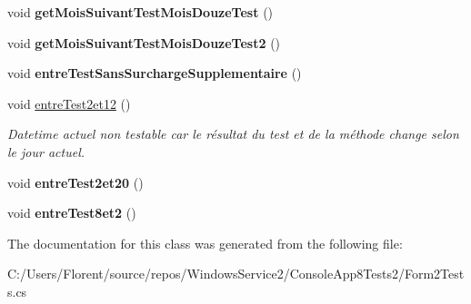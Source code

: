 \begin{DoxyCompactItemize}
void {\bfseries get\+Mois\+Suivant\+Test\+Mois\+Douze\+Test} ()
\item 
\mbox{\label{class_console_app8_1_1_tests_1_1_form2_tests_a39820ca5dbf72c7520d393cbc1061151}} 
void {\bfseries get\+Mois\+Suivant\+Test\+Mois\+Douze\+Test2} ()
\item 
\mbox{\label{class_console_app8_1_1_tests_1_1_form2_tests_af0edbaf4f9b3ba05e88de2fd713944c2}} 
void {\bfseries entre\+Test\+Sans\+Surcharge\+Supplementaire} ()
\item 
\mbox{\label{class_console_app8_1_1_tests_1_1_form2_tests_afc4010f74fbfdd5be9b918a9f07ba49f}} 
void \mbox{\hyperlink{class_console_app8_1_1_tests_1_1_form2_tests_afc4010f74fbfdd5be9b918a9f07ba49f}{entre\+Test2et12}} ()
\begin{DoxyCompactList}\small\item\em Datetime actuel non testable car le résultat du test et de la méthode change selon le jour actuel. \end{DoxyCompactList}\item 
\mbox{\label{class_console_app8_1_1_tests_1_1_form2_tests_a2b204f38ff56572a0bf2dcd1d1ec6f6e}} 
void {\bfseries entre\+Test2et20} ()
\item 
\mbox{\label{class_console_app8_1_1_tests_1_1_form2_tests_a92a2cbc6414e47fe333e5dfa3c1fcea2}} 
void {\bfseries entre\+Test8et2} ()
\end{DoxyCompactItemize}


The documentation for this class was generated from the following file\+:\begin{DoxyCompactItemize}
\item 
C\+:/\+Users/\+Florent/source/repos/\+Windows\+Service2/\+Console\+App8\+Tests2/Form2\+Tests.\+cs\end{DoxyCompactItemize}
